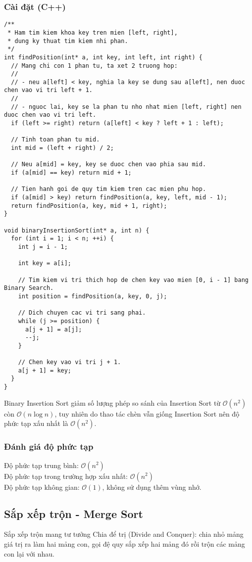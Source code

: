 \documentclass[]{article}
\begin{document}
\subsubsection{Cài đặt (C++)}
\begin{lstlisting}
/**
 * Ham tim kiem khoa key tren mien [left, right],
 * dung ky thuat tim kiem nhi phan.
 */
int findPosition(int* a, int key, int left, int right) {
  // Mang chi con 1 phan tu, ta xet 2 truong hop:
  //
  // - neu a[left] < key, nghia la key se dung sau a[left], nen duoc chen vao vi tri left + 1.
  //
  // - nguoc lai, key se la phan tu nho nhat mien [left, right] nen duoc chen vao vi tri left.
  if (left >= right) return (a[left] < key ? left + 1 : left);

  // Tinh toan phan tu mid.
  int mid = (left + right) / 2;

  // Neu a[mid] = key, key se duoc chen vao phia sau mid.
  if (a[mid] == key) return mid + 1;

  // Tien hanh goi de quy tim kiem tren cac mien phu hop.
  if (a[mid] > key) return findPosition(a, key, left, mid - 1);
  return findPosition(a, key, mid + 1, right);
}

void binaryInsertionSort(int* a, int n) {
  for (int i = 1; i < n; ++i) {
    int j = i - 1;

    int key = a[i];

    // Tim kiem vi tri thich hop de chen key vao mien [0, i - 1] bang Binary Search.
    int position = findPosition(a, key, 0, j);

    // Dich chuyen cac vi tri sang phai.
    while (j >= position) {
      a[j + 1] = a[j];
      --j;
    }

    // Chen key vao vi tri j + 1.
    a[j + 1] = key;
  }
}
\end{lstlisting}Binary Insertion Sort giảm số lượng phép so sánh của Insertion Sort từ $\mathcal{O}(n^2)$ còn $\mathcal{O}(n \log n)$, tuy nhiên do thao tác chèn vẫn giống Insertion Sort nên độ phức tạp xấu nhất là $\mathcal{O}(n^2)$.

\subsubsection{Đánh giá độ phức tạp}
Độ phức tạp trung bình: $\mathcal{O}(n^2)$
\\
Độ phức tạp trong trường hợp xấu nhất: $\mathcal{O}(n^2)$
\\
Độ phức tạp không gian: $\mathcal{O}(1)$, không sử dụng thêm vùng nhớ.

\subsection{Sắp xếp trộn - Merge Sort}
Sắp xếp trộn mang tư tưởng Chia để trị (Divide and Conquer): chia nhỏ mảng giá trị ra làm hai mảng con, gọi đệ quy sắp xếp hai mảng đó rồi trộn các mảng con lại với nhau.
\end{document}
